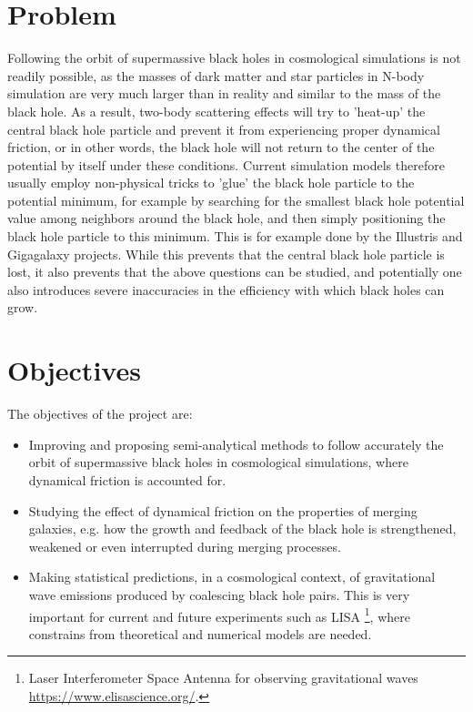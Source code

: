 \documentclass[a4,useAMS,usenatbib,usegraphicx,12pt]{article}
\begin{document}
\section{Problem}


Following the orbit of supermassive black holes in cosmological simulations is 
not readily possible, as the masses of dark matter and star particles in N-body 
simulation are very much larger than in reality and similar to the mass of the 
black hole. As a result, two-body scattering effects will try to 'heat-up' the 
central black hole particle and prevent it from experiencing proper dynamical 
friction, or in other words, the black hole will not return to the center of the 
potential by itself under these conditions. Current simulation models therefore 
usually employ non-physical tricks to 'glue' the black hole particle to the 
potential minimum, for example by searching for the smallest black hole potential 
value among neighbors around the black hole, and then simply positioning the black 
hole particle to this minimum. This is for example done by the Illustris and 
Gigagalaxy projects. While this prevents that the central black hole particle is 
lost, it also prevents that the above questions can be studied, and potentially 
one also introduces severe inaccuracies in the efficiency with which black holes 
can grow.


\section{Objectives}

The objectives of the project are:

\begin{itemize}

\item[\checkmark] Improving and proposing semi-analytical methods to follow 
accurately the orbit of supermassive black holes in cosmological simulations,
where dynamical friction is accounted for.

\item[\checkmark] Studying the effect of dynamical friction on the properties
of merging galaxies, e.g. how the growth and feedback of the black hole is 
strengthened, weakened or even interrupted during merging processes.

\item[\checkmark] Making statistical predictions, in a cosmological context, 
of gravitational wave emissions produced by coalescing black hole pairs.
This is very important for current and future experiments such as LISA
\footnote{Laser Interferometer Space Antenna for observing gravitational waves
\url{https://www.elisascience.org/}.}, where constrains from theoretical and
numerical models are needed.


\end{itemize}
\end{document}

